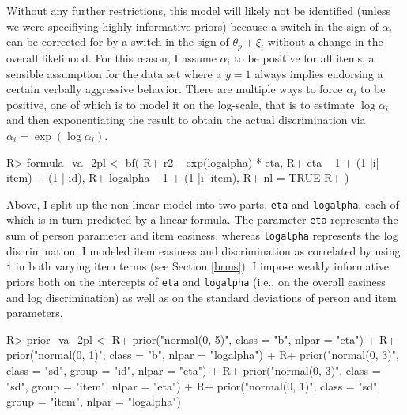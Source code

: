 \documentclass[jss]{jss}
\begin{document}
Without any further restrictions, this model will likely not be
identified (unless we were specifiying highly informative priors)
because a switch in the sign of \(\alpha_i\) can be corrected for by a
switch in the sign of \(\theta_p + \xi_i\) without a change in the
overall likelihood. For this reason, I assume \(\alpha_i\) to be
positive for all items, a sensible assumption for the 
data set where a \(y = 1\) always implies endorsing a certain verbally
aggressive behavior. There are multiple ways to force \(\alpha_i\) to be
positive, one of which is to model it on the log-scale, that is to
estimate \(\log \alpha_i\) and then exponentiating the result to obtain
the actual discrimination via \(\alpha_i = \exp(\log \alpha_i)\).

\begin{CodeChunk}

\begin{CodeInput}
R> formula_va_2pl <- bf(
R+   r2 ~ exp(logalpha) * eta,
R+   eta ~ 1 + (1 |i| item) + (1 | id),
R+   logalpha ~ 1 + (1 |i| item),
R+   nl = TRUE
R+ )
\end{CodeInput}
\end{CodeChunk}

Above, I split up the non-linear model into two parts, \texttt{eta} and
\texttt{logalpha}, each of which is in turn predicted by a linear
formula. The parameter \texttt{eta} represents the sum of person
parameter and item easiness, whereas \texttt{logalpha} represents the
log discrimination. I modeled item easiness and discrimination as
correlated by using \texttt{\textbar{}i\textbar{}} in both varying item
terms (see Section \ref{brms}). I impose weakly informative priors both
on the intercepts of \texttt{eta} and \texttt{logalpha} (i.e., on the
overall easiness and log discrimination) as well as on the standard
deviations of person and item parameters.

\begin{CodeChunk}

\begin{CodeInput}
R> prior_va_2pl <- 
R+   prior("normal(0, 5)", class = "b", nlpar = "eta") +
R+   prior("normal(0, 1)", class = "b", nlpar = "logalpha") +
R+   prior("normal(0, 3)", class = "sd", group = "id", nlpar = "eta") + 
R+   prior("normal(0, 3)", class = "sd", group = "item", nlpar = "eta") +
R+   prior("normal(0, 1)", class = "sd", group = "item", nlpar = "logalpha")
\end{CodeInput}
\end{CodeChunk}
\end{document}
